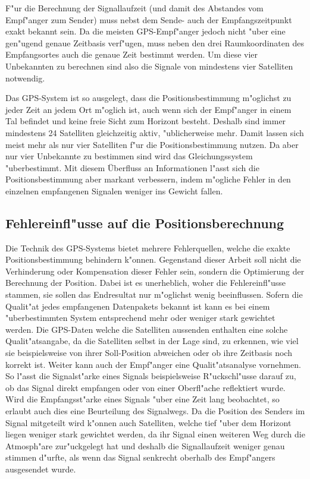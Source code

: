 \begin{refsection}
F"ur die Berechnung der Signallaufzeit (und damit des Abstandes vom
Empf"anger zum Sender) muss nebst dem Sende- auch der Empfangszeitpunkt
exakt bekannt sein. Da die meisten GPS-Empf"anger jedoch nicht "uber eine
gen"ugend genaue Zeitbasis verf"ugen, muss neben den drei Raumkoordinaten
des Empfangsortes auch die genaue Zeit bestimmt werden. Um diese vier
Unbekannten zu berechnen sind also die Signale von mindestens vier
Satelliten notwendig.

Das GPS-System ist so ausgelegt, dass die Positionsbestimmung m"oglichst
zu jeder Zeit an jedem Ort m"oglich ist, auch wenn sich der Empf"anger in
einem Tal befindet und keine freie Sicht zum Horizont besteht. Deshalb
sind immer mindestens 24 Satelliten gleichzeitig aktiv, "ublicherweise
mehr. Damit lassen sich meist mehr als nur vier Satelliten f"ur die
Positionsbestimmung nutzen. Da aber nur vier Unbekannte zu bestimmen
sind wird das Gleichungssystem "uberbestimmt. Mit diesem Überfluss an
Informationen l"asst sich die Positionsbestimmung aber markant verbessern,
indem m"ogliche Fehler in den einzelnen empfangenen Signalen weniger
ins Gewicht fallen.

\subsection{Fehlereinfl"usse auf die Positionsberechnung}
Die Technik des GPS-Systems bietet mehrere Fehlerquellen, welche die
exakte Positionsbestimmung behindern k"onnen. Gegenstand dieser Arbeit
soll nicht die Verhinderung oder Kompensation dieser Fehler sein, sondern
die Optimierung der Berechnung der Position. Dabei ist es unerheblich,
woher die Fehlereinfl"usse stammen, sie sollen das Endresultat nur
m"oglichst wenig beeinflussen. Sofern die Qualit"at jedes empfangenen
Datenpakets bekannt ist kann es bei einem "uberbestimmten System
entsprechend mehr oder weniger stark gewichtet werden. Die GPS-Daten
welche die Satelliten aussenden enthalten eine solche Qualit"atsangabe,
da die Satelliten selbst in der Lage sind, zu erkennen, wie viel sie
beispielsweise von ihrer Soll-Position abweichen oder ob ihre Zeitbasis
noch korrekt ist. Weiter kann auch der Empf"anger eine Qualit"atsanalyse
vornehmen. So l"asst die Signalst"arke eines Signals beispielsweise
R"uckschl"usse darauf zu, ob das Signal direkt empfangen oder von einer
Oberfl"ache reflektiert wurde. Wird die Empfangsst"arke eines Signals
"uber eine Zeit lang beobachtet, so erlaubt auch dies eine Beurteilung
des Signalwegs. Da die Position des Senders im Signal mitgeteilt wird
k"onnen auch Satelliten, welche tief "uber dem Horizont liegen weniger
stark gewichtet werden, da ihr Signal einen weiteren Weg durch die
Atmosph"are zur"uckgelegt hat und deshalb die Signallaufzeit weniger genau
stimmen d"urfte, als wenn das Signal senkrecht oberhalb des Empf"angers
ausgesendet wurde.


\end{refsection}
